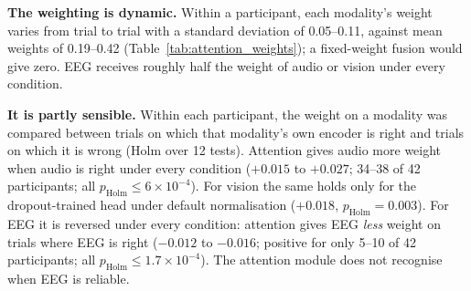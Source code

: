 \begin{table}[htbp]
\centering
\small
\caption{Modality weights under attention rollout on held-out participants: mean over
participants with 95\% bootstrap CI, and the mean within-participant standard deviation
across trials (SD).}
\label{tab:attention_weights}
\end{table}

\textbf{The weighting is dynamic.} Within a participant, each modality's weight varies
from trial to trial with a standard deviation of 0.05--0.11, against mean weights of
0.19--0.42 (Table~\ref{tab:attention_weights}); a fixed-weight fusion would give zero.
EEG receives roughly half the weight of audio or vision under every condition.

\textbf{It is partly sensible.} Within each participant, the weight on a modality was
compared between trials on which that modality's own encoder is right and trials on
which it is wrong (Holm over 12 tests). Attention gives audio more weight when audio is
right under every condition ($+0.015$ to $+0.027$; 34--38 of 42 participants; all
$p_{\mathrm{Holm}} \le 6\times10^{-4}$). For vision the same holds only for the
dropout-trained head under default normalisation ($+0.018$, $p_{\mathrm{Holm}} = 0.003$).
For EEG it is reversed under every condition: attention gives EEG \emph{less} weight on
trials where EEG is right ($-0.012$ to $-0.016$; positive for only 5--10 of 42
participants; all $p_{\mathrm{Holm}} \le 1.7\times10^{-4}$). The attention module does
not recognise when EEG is reliable.

